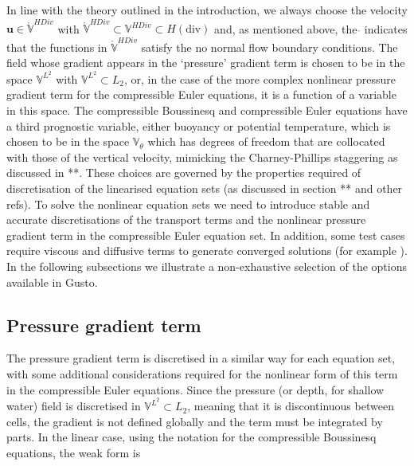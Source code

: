 \documentclass[journal abbreviation, manuscript]{copernicus}
\def\MM#1{\boldsymbol{#1}}
\begin{document}
In line with the theory outlined in the introduction, we always choose
the velocity $\MM{u} \in \ring{\mathbb{V}}^{HDiv}$ with
$\ring{\mathbb{V}}^{HDiv} \subset \mathbb{V}^{HDiv} \subset
H(\text{div})$ and, as mentioned above, the $\ring{}$ indicates that
the functions in $\ring{\mathbb{V}}^{HDiv}$ satisfy the no normal flow
boundary conditions. The field whose gradient appears in the
`pressure' gradient term is chosen to be in the space
$\mathbb{V}^{L^2}$ with $\mathbb{V}^{L^2} \subset L_2$, or, in the
case of the more complex nonlinear pressure gradient term for the
compressible Euler equations, it is a function of a variable in this
space. The compressible Boussinesq and compressible Euler equations
have a third prognostic variable, either buoyancy or potential
temperature, which is chosen to be in the space $\mathbb{V}_\theta$
which has degrees of freedom that are collocated with those of the
vertical velocity, mimicking the Charney-Phillips staggering as
discussed in **. These choices are governed by the properties required
of discretisation of the linearised equation sets (as discussed in
section ** and other refs). To solve the nonlinear equation sets we
need to introduce stable and accurate discretisations of the transport
terms and the nonlinear pressure gradient term in the compressible
Euler equation set. In addition, some test cases require viscous and
diffusive terms to generate converged solutions (for example
\citet{straka1993numerical}). In the following subsections we
illustrate a non-exhaustive selection of the options available in
Gusto.

\subsection{Pressure gradient term}
The pressure gradient term is discretised in a similar way for each
equation set, with some additional considerations required for the
nonlinear form of this term in the compressible Euler equations. Since
the pressure (or depth, for shallow water) field is discretised in
$\mathbb{V}^{L^2} \subset L_2$, meaning that it is discontinuous between
cells, the gradient is not defined globally and the term must be
integrated by parts. In the linear case, using the notation for the
compressible Boussinesq equations, the weak form is
\end{document}

